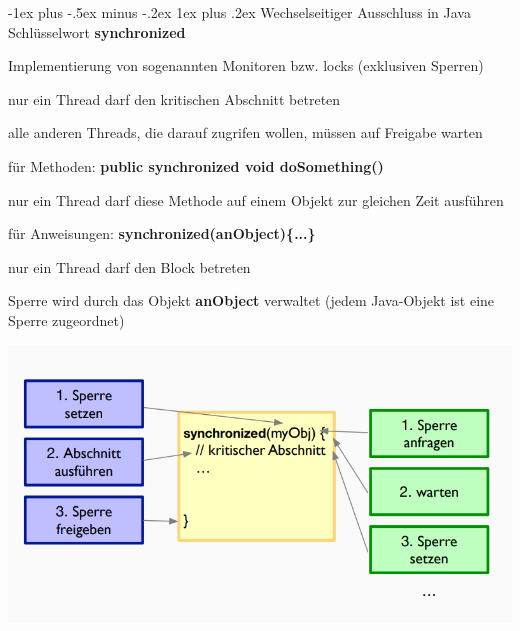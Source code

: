\documentclass[10pt]{article}
\makeatletter
\renewcommand{\subsubsection}{\@startsection{subsubsection}{3}{0mm}%
                                {-1ex plus -.5ex minus -.2ex}%
                                {1ex plus .2ex}%
                                {\normalfont\small\bfseries}}
\makeatother
\begin{document}
  \subsubsection{Wechselseitiger Ausschluss in Java}
  Schlüsselwort \textbf{synchronized}
  \begin{itemize*}
    \item Implementierung von sogenannten Monitoren bzw. locks (exklusiven Sperren)
    \begin{itemize*}
      \item nur ein Thread darf den kritischen Abschnitt betreten
      \item alle anderen Threads, die darauf zugrifen wollen, müssen auf Freigabe warten
    \end{itemize*}
    \item für Methoden: \textbf{public synchronized void doSomething()}
    \begin{itemize*}
      \item nur ein Thread darf diese Methode auf einem Objekt zur gleichen Zeit ausführen
    \end{itemize*}
    \item für Anweisungen: \textbf{synchronized(anObject)\{...\}}
    \begin{itemize*}
      \item nur ein Thread darf den Block betreten
      \item Sperre wird durch das Objekt \textbf{anObject} verwaltet (jedem Java-Objekt ist eine Sperre zugeordnet)
    \end{itemize*}
  \end{itemize*}
  \begin{center}
    \includegraphics[width=0.4\linewidth]{Assets/Programmierparadigmen-java-synchronized}
  \end{center}
\end{document}
